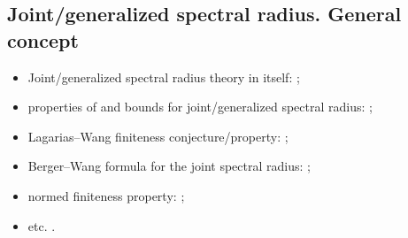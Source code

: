 \subsection*{Joint/generalized spectral radius. General concept}
\begin{itemize}
\item Joint/generalized spectral radius theory in itself: \cite{AhmPar:CDC12, Bar:CDC05, BKPW:LAA08, Blondel:LAA08, Bochi15, Breuillard:ArXiv21, Cicone:ArXiv15, CMS:LAA21, Czornik:LAA05, Els:LAA95, GugZen:LNM14, Jungers:09, Jungers:LNCS13, Morris:LAA17, MorSid:JEMS13, OgurMart:LAA14, PW:LAA08, PWB:CDC05, Prot:FPM96:e, Prot:IZV97:e, Prot:FU98, RotaStr:IM60, ShihWP:LAA97, ShulTur:JFA00, KisShulTur:20, ShulTur:ArXiv08, Strang03, Theys:PhD05, XuXiao:AJIFAC11, MolReif:LAA14, Moller15, MP:DCDCA18};
\item properties of and bounds for joint/generalized spectral radius: \cite{Alpin:MZ10, Breuillard:ArXiv21, CJ:IJAMCS06, CJN:AISC15, Gil:UJMA19, GS:MCRF20, HStr:LASP92, Koz:DEDS10, Koz:LAA10, Maesumi:TIC95, Maesumi:LAA96, Morris:ADVM10, Peperko:LAA12, Wirth:MTNS04, Wirth:LAA05, XuAci:IEEETAC20, Zhou:AMC06};
\item Lagarias--Wang finiteness conjecture/property: \cite{BTV:MTNS02, BTV:SIAMJMA03, BM:JAMS02, Charina:ACHA13, CGSZ:LAA10, CJ:IJAMCS07, Dai:ArXiv11, Dai:LAA13, DHX:PAMS13, DK:INFOPROC11:e, HMST:AdvMath11, JenPoll:ETDS17, JP:SIAMJMA09, JB:LAA08, Koz:CDC05:e, Koz:WIAS05, Koz:INFOPROC06:e, Koz:LAA16, LagWang:LAA95, Morris:LAA10, PanScl:Nonlin21, WangWen:CIS13};
\item Berger--Wang formula for the joint spectral radius: \cite{BF:ArXiv18, Breuillard:ArXiv21, Koz:LAA14, Morris:JFA12, Oregon-Reyes:JEPM20};
\item normed finiteness property: \cite{LiShih:LAA08};
\item etc. \cite{GugZen:LAA12, Koz:LAA09, Oreg-Reyes:MastThes18, Pascoe:ArXiv19}.
\end{itemize}

